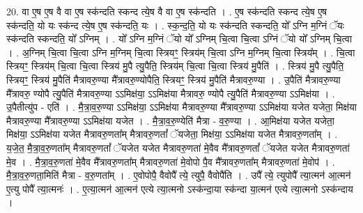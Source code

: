 \documentclass[17pt]{extarticle}
\begin{document}
20. वा ए॒ष ए॒ष वै वा ए॒ष स्क॑न्दति स्कन्द त्ये॒ष वै वा ए॒ष स्क॑न्दति । . ए॒ष स्क॑न्दति स्कन्द त्ये॒ष ए॒ष स्क॑न्दति॒ यो यः स्क॑न्द त्ये॒ष ए॒ष स्क॑न्दति॒ यः । . स्क॒न्द॒ति॒ यो यः स्क॑न्दति स्कन्दति॒ यो᳚ ऽग्नि म॒ग्निं ॅयः स्क॑न्दति स्कन्दति॒ यो᳚ ऽग्निम् । . यो᳚ ऽग्नि म॒ग्निं ॅयो यो᳚ ऽग्निम् चि॒त्वा चि॒त्वा ऽग्निं ॅयो यो᳚ ऽग्निम् चि॒त्वा । . अ॒ग्निम् चि॒त्वा चि॒त्वा ऽग्नि म॒ग्निम् चि॒त्वा स्त्रियꣳ॒॒ स्त्रिय॑म् चि॒त्वा ऽग्नि म॒ग्निम् चि॒त्वा स्त्रिय᳚म् । . चि॒त्वा स्त्रियꣳ॒॒ स्त्रिय॑म् चि॒त्वा चि॒त्वा स्त्रिय॑ मु॒पै त्यु॒पैति॒ स्त्रिय॑म् चि॒त्वा चि॒त्वा स्त्रिय॑ मु॒पैति॑ । . स्त्रिय॑ मु॒पै त्यु॒पैति॒ स्त्रियꣳ॒॒ स्त्रिय॑ मु॒पैति॑ मैत्रावरु॒ण्या मै᳚त्रावरु॒ण्योपैति॒ स्त्रियꣳ॒॒ स्त्रिय॑ मु॒पैति॑ मैत्रावरु॒ण्या । . उ॒पैति॑ मैत्रावरु॒ण्या मै᳚त्रावरु॒ ण्योपै त्यु॒पैति॑ मैत्रावरु॒ण्या ऽऽमिक्ष॑या॒ ऽऽमिक्ष॑या मैत्रावरु॒
ण्योपै त्यु॒पैति॑ मैत्रावरु॒ण्या ऽऽमिक्ष॑या । . उ॒पैतीत्यु॑प - एति॑ । . मै॒त्रा॒व॒रु॒ण्या ऽऽमिक्ष॑या॒ ऽऽमिक्ष॑या मैत्रावरु॒ण्या मै᳚त्रावरु॒ण्या ऽऽमिक्ष॑या यजेत यजेता॒ मिक्ष॑या मैत्रावरु॒ण्या मै᳚त्रावरु॒ण्या ऽऽमिक्ष॑या यजेत । . मै॒त्रा॒व॒रु॒ण्येति॑ मैत्रा - व॒रु॒ण्या । . आ॒मिक्ष॑या यजेत यजेता॒ मिक्ष॑या॒ ऽऽमिक्ष॑या यजेत मैत्रावरु॒णता᳚म् मैत्रावरु॒णतां᳚ ॅयजेता॒ मिक्ष॑या॒ ऽऽमिक्ष॑या यजेत मैत्रावरु॒णता᳚म् । . य॒जे॒त॒ मै॒त्रा॒व॒रु॒णता᳚म् मैत्रावरु॒णतां᳚ ॅयजेत यजेत मैत्रावरु॒णता॑ मे॒वैव मै᳚त्रावरु॒णतां᳚ ॅयजेत यजेत मैत्रावरु॒णता॑ मे॒व । . मै॒त्रा॒व॒रु॒णता॑ मे॒वैव मै᳚त्रावरु॒णता᳚म् मैत्रावरु॒णता॑ मे॒वोपो पै॒व मै᳚त्रावरु॒णता᳚म् मैत्रावरु॒णता॑ मे॒वोप॑ । . मै॒त्रा॒व॒रु॒णता॒मिति॑ मैत्रा - व॒रु॒णता᳚म् । . ए॒वोपोपै॒ वैवोपै᳚ त्ये॒ त्युपै॒ वैवोपै॑ति । . उपै᳚ त्ये॒ त्युपोपै᳚ त्या॒त्मन॑ आ॒त्मन॑ ए॒त्यु पोपै᳚ त्या॒त्मनः॑ । . ए॒त्या॒त्मन॑ आ॒त्मन॑ एत्ये त्या॒त्मनो ऽस्क॑न्दा॒या स्क॑न्दा या॒त्मन॑ एत्ये त्या॒त्मनो ऽस्क॑न्दाय । \newline
\end{document}
